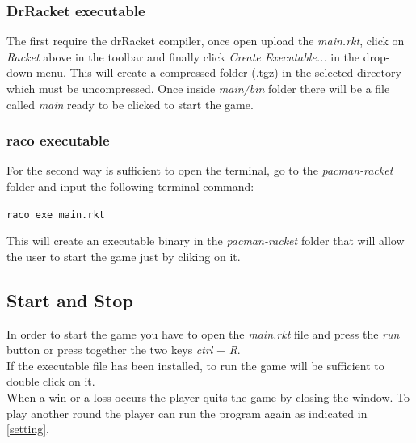 \documentclass{article}
\begin{document}
\subsubsection{DrRacket executable}

The first require the drRacket compiler, once open upload the \textit{main.rkt}, click on \textit{Racket} above in the toolbar and finally click \textit{Create Executable...} in the drop-down menu. This will create a compressed folder (.tgz) in the selected directory which must be uncompressed. Once inside \textit{main/bin} folder there will be a file called \textit{main} ready to be clicked to start the game.

\subsubsection{raco executable}
For the second way is sufficient to open the terminal, go to the \textit{pacman-racket} folder and input the following terminal command:
\begin{center}
 \texttt{raco exe main.rkt}
\end{center}

This will create an executable binary in the \textit{pacman-racket} folder that will allow the user to start the game just by cliking on it.

\subsection{Start and Stop}
In order to start the game you have to open the \textit{main.rkt} file and press the \textit{run} button or press together the two keys \textit{ctrl} + \textit{R}.\\
If the executable file has been installed, to run the game will be sufficient to double click on it.\\
When a win or a loss occurs the player quits the game by closing the window. To play another round the player can run the program again as indicated in \ref{setting}.

 
\end{document}
